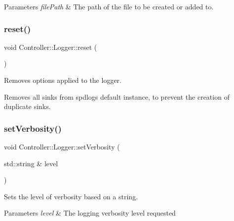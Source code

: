 \begin{DoxyParams}{Parameters}
{\em file\+Path} & The path of the file to be created or added to. \\
\hline
\end{DoxyParams}
\mbox{\label{namespaceController_1_1Logger_af6dad87d5575525f3ab749ead10da772}} 
\subsubsection{\texorpdfstring{reset()}{reset()}}
{\footnotesize\ttfamily void Controller\+::\+Logger\+::reset (\begin{DoxyParamCaption}{ }\end{DoxyParamCaption})}



Removes options applied to the logger. 

Removes all sinks from spdlog\textquotesingle{}s default instance, to prevent the creation of duplicate sinks. \mbox{\label{namespaceController_1_1Logger_a4d446defe9f1cd8fa09b3bc042001c18}} 
\subsubsection{\texorpdfstring{setVerbosity()}{setVerbosity()}}
{\footnotesize\ttfamily void Controller\+::\+Logger\+::set\+Verbosity (\begin{DoxyParamCaption}\item[{std\+::string \&}]{level }\end{DoxyParamCaption})}



Sets the level of verbosity based on a string. 


\begin{DoxyParams}{Parameters}
{\em level} & The logging verbosity level requested \\
\hline
\end{DoxyParams}
